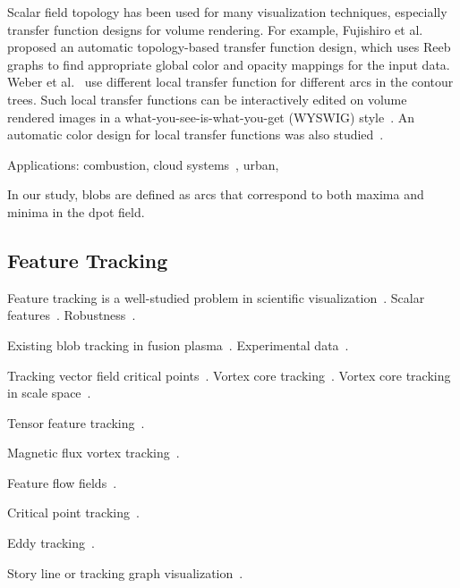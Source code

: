 Scalar field topology has been used for many visualization techniques, especially transfer function designs for volume rendering.  For example, Fujishiro et al.~\cite{FujishiroAT99} proposed an automatic topology-based transfer function design, which uses Reeb graphs to find appropriate global color and opacity mappings for the input data.  Weber et al.~\cite{WeberDCPH07} use different local transfer function for different arcs in the contour trees.  Such local transfer functions can be interactively edited on volume rendered images in a what-you-see-is-what-you-get (WYSWIG) style~\cite{GuoY13}.  An automatic color design for local transfer functions was also studied~\cite{ZhouT09}.  


Applications: combustion, cloud systems~\cite{DoraiswamyNN13}, urban, 



In our study, blobs are defined as arcs that correspond to both maxima and minima in the dpot field.  



\subsection{Feature Tracking}

Feature tracking is a well-studied problem in scientific visualization~\cite{PostVHLD2003}.  Scalar features~\cite{SilverW98}.  Robustness~\cite{SkrabaW14}.  

Existing blob tracking in fusion plasma~\cite{WuWSCCSCK16}.  Experimental data~\cite{DavisKMRSZ14}.  

Tracking vector field critical points~\cite{GarthTS04}.  Vortex core tracking~\cite{TheiselSWHS05}.  Vortex core tracking in scale space~\cite{BauerP02}.  

Tensor feature tracking~\cite{TricocheSH01, TricocheWSH02}.  

Magnetic flux vortex tracking~\cite{GuoPPKG16, GuoPG17, PhillipsGPKG16, PhillipsPKG15}.

Feature flow fields~\cite{TheiselS03, WeinkaufTGP11}. 

Critical point tracking~\cite{ReininghausKWH12}.

Eddy tracking~\cite{WoodringPSPAH16}.  

Story line or tracking graph visualization~\cite{TanahashiM12, GuoPPKG16}.  



